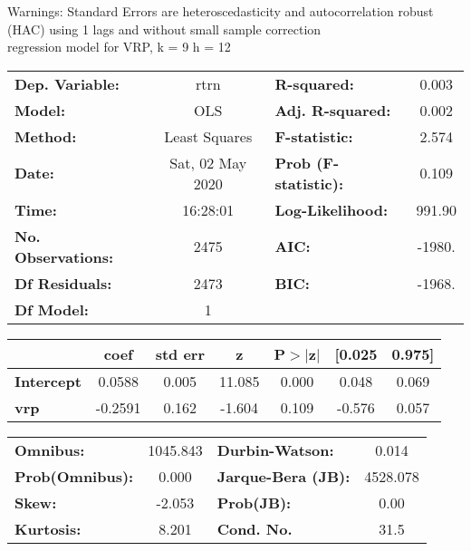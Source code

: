 Warnings: \newline
 [1] Standard Errors are heteroscedasticity and autocorrelation robust (HAC) using 1 lags and without small sample correction\\ 

regression model for VRP, k = 9 h = 12\begin{center}
\begin{tabular}{lclc}
\toprule
\textbf{Dep. Variable:}    &       rtrn       & \textbf{  R-squared:         } &     0.003   \\
\textbf{Model:}            &       OLS        & \textbf{  Adj. R-squared:    } &     0.002   \\
\textbf{Method:}           &  Least Squares   & \textbf{  F-statistic:       } &     2.574   \\
\textbf{Date:}             & Sat, 02 May 2020 & \textbf{  Prob (F-statistic):} &    0.109    \\
\textbf{Time:}             &     16:28:01     & \textbf{  Log-Likelihood:    } &    991.90   \\
\textbf{No. Observations:} &        2475      & \textbf{  AIC:               } &    -1980.   \\
\textbf{Df Residuals:}     &        2473      & \textbf{  BIC:               } &    -1968.   \\
\textbf{Df Model:}         &           1      & \textbf{                     } &             \\
\bottomrule
\end{tabular}
\begin{tabular}{lcccccc}
                   & \textbf{coef} & \textbf{std err} & \textbf{z} & \textbf{P$> |$z$|$} & \textbf{[0.025} & \textbf{0.975]}  \\
\midrule
\textbf{Intercept} &       0.0588  &        0.005     &    11.085  &         0.000        &        0.048    &        0.069     \\
\textbf{vrp}       &      -0.2591  &        0.162     &    -1.604  &         0.109        &       -0.576    &        0.057     \\
\bottomrule
\end{tabular}
\begin{tabular}{lclc}
\textbf{Omnibus:}       & 1045.843 & \textbf{  Durbin-Watson:     } &    0.014  \\
\textbf{Prob(Omnibus):} &   0.000  & \textbf{  Jarque-Bera (JB):  } & 4528.078  \\
\textbf{Skew:}          &  -2.053  & \textbf{  Prob(JB):          } &     0.00  \\
\textbf{Kurtosis:}      &   8.201  & \textbf{  Cond. No.          } &     31.5  \\
\bottomrule
\end{tabular}
\end{center}

